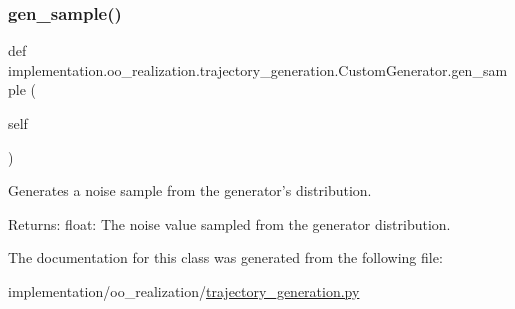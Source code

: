 \subsubsection{\texorpdfstring{gen\+\_\+sample()}{gen\_sample()}}
{\footnotesize\ttfamily def implementation.\+oo\+\_\+realization.\+trajectory\+\_\+generation.\+Custom\+Generator.\+gen\+\_\+sample (\begin{DoxyParamCaption}\item[{}]{self }\end{DoxyParamCaption})}

\begin{DoxyVerb}Generates a noise sample from the generator's distribution.

Returns:
    float: The noise value sampled from the generator distribution.
\end{DoxyVerb}
 

The documentation for this class was generated from the following file\+:\begin{DoxyCompactItemize}
\item 
implementation/oo\+\_\+realization/\hyperlink{trajectory__generation_8py}{trajectory\+\_\+generation.\+py}\end{DoxyCompactItemize}
